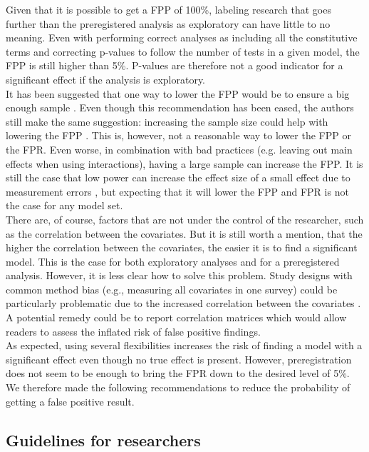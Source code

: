 Given that it is possible to get a FPP of 100\%, labeling research that goes further than the preregistered analysis as exploratory can have little to no meaning. Even with performing correct analyses as including all the constitutive terms and correcting p-values to follow the number of tests in a given model, the FPP is still higher than 5\%. P-values are therefore not a good indicator for a significant effect if the analysis is exploratory. \\
    
It has been suggested that one way to lower the FPP would be to ensure a big enough sample \citep{Simmons2011}. Even though this recommendation has been eased, the authors still make the same suggestion: increasing the sample size could help with lowering the FPP \cite{simmons2018}. This is, however, not a reasonable way to lower the FPP or the FPR. Even worse, in combination with bad practices (e.g. leaving out main effects when using interactions), having a large sample can increase the FPP. It is still the case that low power can increase the effect size of a small effect due to measurement errors \citep{loken2017measurement}, but expecting that it will lower the FPP and FPR is not the case for any model set. \\

There are, of course, factors that are not under the control of the researcher, such as the correlation between the covariates. But it is still worth a mention, that the higher the correlation between the covariates, the easier it is to find a significant model. This is the case for both exploratory analyses and for a preregistered analysis. However, it is less clear how to solve this problem. Study designs with common method bias (e.g., measuring all covariates in one survey) could be particularly problematic due to  the increased correlation between the covariates \citep{podsakoff2003}. A potential remedy could be to report correlation matrices which would allow readers to assess the inflated risk of false positive findings.  \\ 

As expected, using several flexibilities increases the risk of finding a model with a significant effect even though no true effect is present. However, preregistration does not seem to be enough to bring the FPR down to the desired level of 5\%. We therefore made the following recommendations to reduce the probability of getting a false positive result. 

\subsection{Guidelines for researchers}

